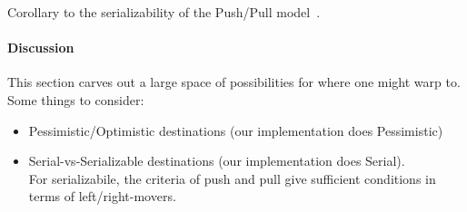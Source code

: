     
\begin{theorem}[Serializability]
Corollary to the serializability of the Push/Pull model~\cite{pmpy}.
\end{theorem}


\paragraph{Discussion}

This section carves out a large space of possibilities for where one
might warp to. Some things to consider:

\begin{itemize}
\item Pessimistic/Optimistic destinations 
  (our implementation does Pessimistic)
\item Serial-vs-Serializable destinations
  (our implementation does Serial).\\
  For serializabile, the criteria of {\sc push} and {\sc pull} give
  sufficient conditions in terms of left/right-movers.
\end{itemize}



